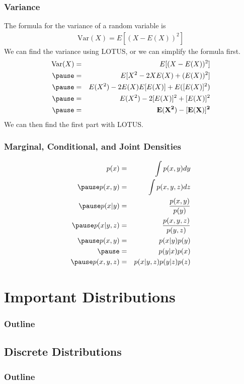 \documentclass[handout]{beamer}
\begin{document}
\begin{frame}
\frametitle{Variance}
\pause
The formula for the variance of a random variable is 
\begin{eqnarray*}
\mathrm{Var}(X) = E[(X - E(X))^2]
\end{eqnarray*}
\pause
We can find the variance using LOTUS, \pause or we can simplify the
formula first.
\pause
\begin{eqnarray*}
\mathrm{Var}(X) &=& E[(X - E(X))^2]\\
\pause
&=& E[X^2 - 2 X E(X) + (E(X))^2]\\
\pause
&=& E(X^2) - 2 E(X) E[E(X)] + E([E(X)]^2)\\
\pause
&=& E(X^2) - 2 [E(X)]^2 + [E(X)]^2\\
\pause
&=& \mathbf{E(X^2) - [E(X)]^2}
\end{eqnarray*}
\pause
We can then find the first part with LOTUS.
\end{frame}

\begin{frame}
\frametitle{Marginal, Conditional, and Joint Densities}
\pause
\begin{eqnarray*}
p(x) &=& \int p(x,y) dy\\
\pause
p(x,y) &=& \int p(x,y,z) dz\\
\pause
p(x|y) &=& \frac{p(x,y)}{p(y)}\\
\pause
p(x|y,z) &=& \frac{p(x,y,z)}{p(y,z)}\\
\pause
p(x,y) &=& p(x | y) p(y)\\
\pause
&=& p(y | x) p(x) \\
\pause
p(x,y,z) &=& p(x | y,z) p(y|z) p(z)
\end{eqnarray*}
\end{frame}



\section{Important Distributions}


\begin{frame}
\frametitle{Outline}
\tableofcontents[currentsection]
\end{frame}

\subsection{Discrete Distributions}


\begin{frame}
\frametitle{Outline}
\tableofcontents[currentsubsection]
\end{frame}
\end{document}
